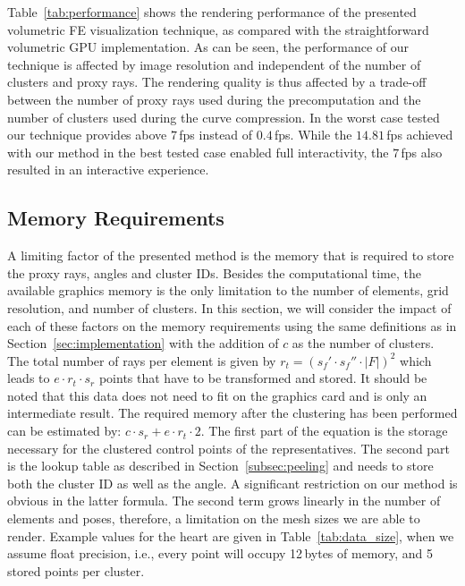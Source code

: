\documentclass[journal]{vgtc}                %
\begin{document}
Table~\ref{tab:performance} shows the rendering performance of the presented volumetric FE visualization technique, as compared with the straightforward volumetric GPU implementation. As can be seen, the performance of our technique is affected by image resolution and independent of the number of clusters and proxy rays. The rendering quality is thus affected by a trade-off between the number of proxy rays used during the precomputation and the number of clusters used during the curve compression. In the worst case tested our technique provides above $7$\,fps instead of $0.4$\,fps. While the $14.81$\,fps achieved with our method in the best tested case enabled full interactivity, the $7$\,fps also resulted in an interactive experience.
%
%
%
\subsection{Memory Requirements}\label{subsec:memory}
A limiting factor of the presented method is the memory that is required to store the proxy rays, angles and cluster IDs. Besides the computational time, the available graphics memory is the only limitation to the number of elements, grid resolution, and number of clusters. In this section, we will consider the impact of each of these factors on the memory requirements using the same definitions as in Section~\ref{sec:implementation} with the addition of $c$ as the number of clusters. The total number of rays per element is given by $r_t = (s_f' \cdot s_f'' \cdot \left|F\right|)^2$ which leads to $e \cdot r_t \cdot s_r$ points that have to be transformed and stored. It should be noted that this data does not need to fit on the graphics card and is only an intermediate result. The required memory after the clustering has been performed can be estimated by: $c \cdot s_r + e \cdot r_t\cdot 2$. The first part of the equation is the storage necessary for the clustered control points of the representatives. The second part is the lookup table as described in Section~\ref{subsec:peeling} and needs to store both the cluster ID as well as the angle. A significant restriction on our method is obvious in the latter formula. The second term grows linearly in the number of elements and poses, therefore, a limitation on the mesh sizes we are able to render. Example values for the heart are given in Table~\ref{tab:data_size}, when we assume float precision, i.e., every point will occupy 12\,bytes of memory, and 5 stored points per cluster.
%
%
%
\end{document}
